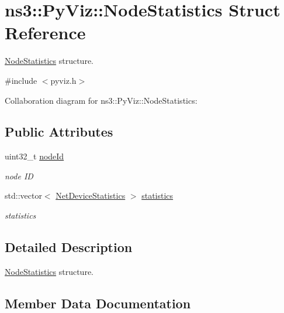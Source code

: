 \hypertarget{structns3_1_1PyViz_1_1NodeStatistics}{}\section{ns3\+:\+:Py\+Viz\+:\+:Node\+Statistics Struct Reference}
\label{structns3_1_1PyViz_1_1NodeStatistics}


\hyperlink{structns3_1_1PyViz_1_1NodeStatistics}{Node\+Statistics} structure.  




{\ttfamily \#include $<$pyviz.\+h$>$}



Collaboration diagram for ns3\+:\+:Py\+Viz\+:\+:Node\+Statistics\+:
\subsection*{Public Attributes}
\begin{DoxyCompactItemize}
\item 
uint32\+\_\+t \hyperlink{structns3_1_1PyViz_1_1NodeStatistics_a400ac6506760da840f6239363411d6da}{node\+Id}
\begin{DoxyCompactList}\small\item\em node ID \end{DoxyCompactList}\item 
std\+::vector$<$ \hyperlink{structns3_1_1PyViz_1_1NetDeviceStatistics}{Net\+Device\+Statistics} $>$ \hyperlink{structns3_1_1PyViz_1_1NodeStatistics_a2ba3435c3db3286d685dd8a59db6285a}{statistics}
\begin{DoxyCompactList}\small\item\em statistics \end{DoxyCompactList}\end{DoxyCompactItemize}


\subsection{Detailed Description}
\hyperlink{structns3_1_1PyViz_1_1NodeStatistics}{Node\+Statistics} structure. 

\subsection{Member Data Documentation}

